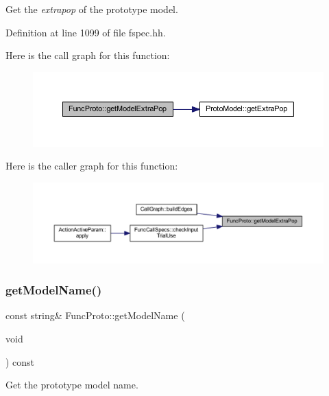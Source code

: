 Get the {\itshape extrapop} of the prototype model. 



Definition at line 1099 of file fspec.\+hh.

Here is the call graph for this function\+:
\nopagebreak
\begin{figure}[H]
\begin{center}
\leavevmode
\includegraphics[width=350pt]{class_func_proto_a36076943e0845125efffbd7d1d1e46ef_cgraph}
\end{center}
\end{figure}
Here is the caller graph for this function\+:
\nopagebreak
\begin{figure}[H]
\begin{center}
\leavevmode
\includegraphics[width=350pt]{class_func_proto_a36076943e0845125efffbd7d1d1e46ef_icgraph}
\end{center}
\end{figure}
\mbox{\label{class_func_proto_abd50bddd2379651954a05e2015ab907e}} 
\subsubsection{\texorpdfstring{getModelName()}{getModelName()}}
{\footnotesize\ttfamily const string\& Func\+Proto\+::get\+Model\+Name (\begin{DoxyParamCaption}\item[{void}]{ }\end{DoxyParamCaption}) const\hspace{0.3cm}{\ttfamily [inline]}}



Get the prototype model name. 



